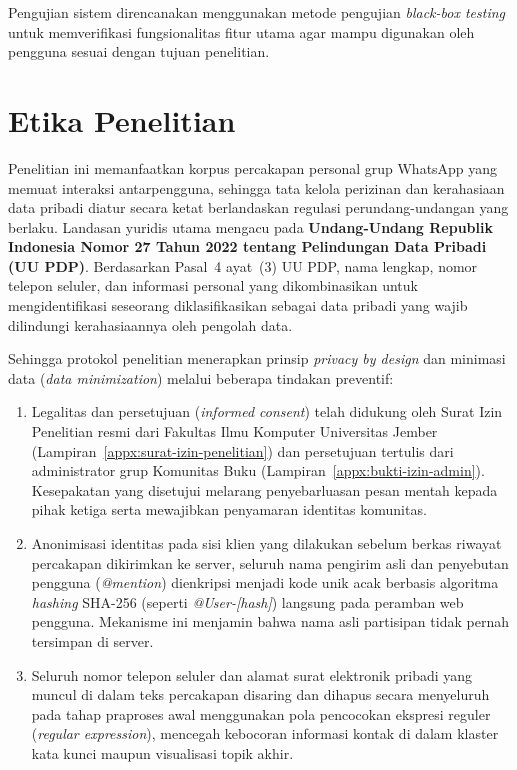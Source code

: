 Pengujian sistem direncanakan menggunakan metode pengujian \textit{black-box testing} untuk memverifikasi fungsionalitas fitur utama agar mampu digunakan oleh pengguna sesuai dengan tujuan penelitian.

\section{Etika Penelitian}
\label{sec:ethics}

Penelitian ini memanfaatkan korpus percakapan personal grup WhatsApp yang memuat interaksi antarpengguna, sehingga tata kelola perizinan dan kerahasiaan data pribadi diatur secara ketat berlandaskan regulasi perundang-undangan yang berlaku. Landasan yuridis utama mengacu pada \textbf{Undang-Undang Republik Indonesia Nomor 27 Tahun 2022 tentang Pelindungan Data Pribadi (UU PDP)}. Berdasarkan Pasal~4 ayat~(3) UU PDP, nama lengkap, nomor telepon seluler, dan informasi personal yang dikombinasikan untuk mengidentifikasi seseorang diklasifikasikan sebagai data pribadi yang wajib dilindungi kerahasiaannya oleh pengolah data.

Sehingga protokol penelitian menerapkan prinsip \textit{privacy by design} dan minimasi data (\textit{data minimization}) melalui beberapa tindakan preventif:
\begin{enumerate}[label=\alph*., leftmargin=*, itemsep=2pt]
	\item Legalitas dan persetujuan (\textit{informed consent}) telah didukung oleh Surat Izin Penelitian resmi dari Fakultas Ilmu Komputer Universitas Jember (Lampiran~\ref{appx:surat-izin-penelitian}) dan persetujuan tertulis dari administrator grup Komunitas Buku (Lampiran~\ref{appx:bukti-izin-admin}). Kesepakatan yang disetujui melarang penyebarluasan pesan mentah kepada pihak ketiga serta mewajibkan penyamaran identitas komunitas.
	\item Anonimisasi identitas pada sisi klien yang dilakukan sebelum berkas riwayat percakapan dikirimkan ke server, seluruh nama pengirim asli dan penyebutan pengguna (\textit{@mention}) dienkripsi menjadi kode unik acak berbasis algoritma \textit{hashing} SHA-256 (seperti \textit{@User-[hash]}) langsung pada peramban web pengguna. Mekanisme ini menjamin bahwa nama asli partisipan tidak pernah tersimpan di server.
	\item Seluruh nomor telepon seluler dan alamat surat elektronik pribadi yang muncul di dalam teks percakapan disaring dan dihapus secara menyeluruh pada tahap praproses awal menggunakan pola pencocokan ekspresi reguler (\textit{regular expression}), mencegah kebocoran informasi kontak di dalam klaster kata kunci maupun visualisasi topik akhir.
\end{enumerate}

